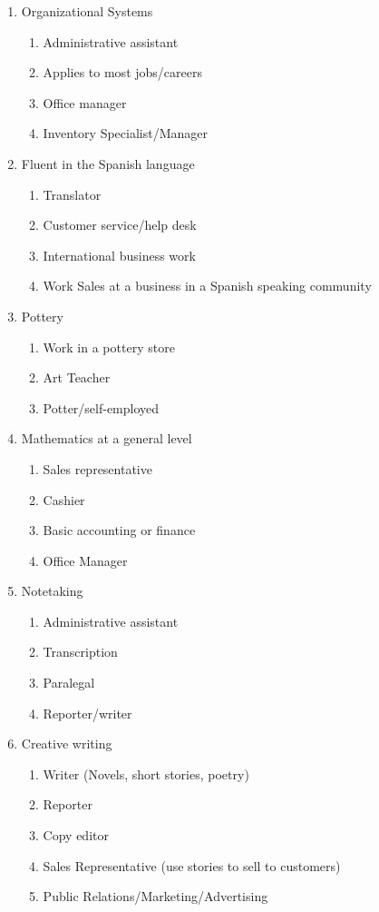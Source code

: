 \begin{enumerate}[leftmargin=1cm]
\begin{enumerate}
	      \end{enumerate}
	\item Organizational Systems
	      \begin{enumerate}
		      \item Administrative assistant
		      \item Applies to most jobs/careers
		      \item Office manager
		      \item Inventory Specialist/Manager
	      \end{enumerate}
	\item Fluent in the Spanish language
	      \begin{enumerate}
		      \item Translator
		      \item Customer service/help desk
		      \item International business work
		      \item Work Sales at a business in a Spanish speaking community
	      \end{enumerate}
	\item Pottery
	      \begin{enumerate}
		      \item Work in a pottery store
		      \item Art Teacher
		      \item Potter/self-employed
	      \end{enumerate}
	\item Mathematics at a general level
	      \begin{enumerate}
		      \item Sales representative
		      \item Cashier
		      \item Basic accounting or finance
		      \item Office Manager
	      \end{enumerate}
	\item Notetaking
	      \begin{enumerate}
		      \item Administrative assistant
		      \item Transcription
		      \item Paralegal
		      \item Reporter/writer
	      \end{enumerate}
	\item Creative writing
	      \begin{enumerate}
		      \item Writer (Novels, short stories, poetry)
		      \item Reporter
		      \item Copy editor
		      \item Sales Representative (use stories to sell to customers)
		      \item Public Relations/Marketing/Advertising
	      \end{enumerate}
\end{enumerate}
